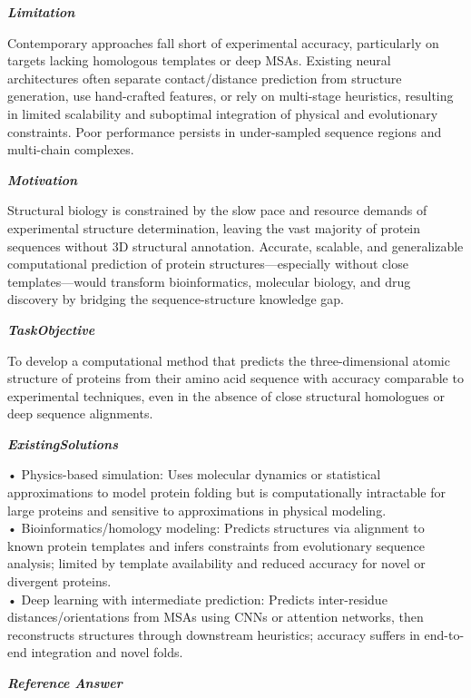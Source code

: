 \begin{tcolorbox}[
    breakable,
    title={Example of Idea Generation in Life},
    colback=LighterGray,
    colframe=DeepPurple,
    colbacktitle=DeepPurple,
    coltitle=White,
]
\textbf{\emph{\textcolor{CaseOrange}{Limitation}}}

Contemporary approaches fall short of experimental accuracy, particularly on targets lacking
homologous templates or deep MSAs. Existing neural architectures often separate contact/distance
prediction from structure generation, use hand-crafted features, or rely on multi-stage heuristics,
resulting in limited scalability and suboptimal integration of physical and evolutionary
constraints. Poor performance persists in under-sampled sequence regions and multi-chain complexes.

\textbf{\emph{\textcolor{CaseOrange}{Motivation}}}

Structural biology is constrained by the slow pace and resource demands of experimental structure
determination, leaving the vast majority of protein sequences without 3D structural annotation.
Accurate, scalable, and generalizable computational prediction of protein structures—especially
without close templates—would transform bioinformatics, molecular biology, and drug discovery by
bridging the sequence-structure knowledge gap.

\textbf{\emph{\textcolor{CaseOrange}{TaskObjective}}}

To develop a computational method that predicts the three-dimensional atomic structure of proteins
from their amino acid sequence with accuracy comparable to experimental techniques, even in the
absence of close structural homologues or deep sequence alignments.

\textbf{\emph{\textcolor{CaseOrange}{ExistingSolutions}}}

• Physics-based simulation: Uses molecular dynamics or statistical approximations to model protein folding but is computationally intractable for large proteins and sensitive to approximations in physical modeling. \\
• Bioinformatics/homology modeling: Predicts structures via alignment to known protein templates and infers constraints from evolutionary sequence analysis; limited by template availability and reduced accuracy for novel or divergent proteins. \\
• Deep learning with intermediate prediction: Predicts inter-residue distances/orientations from MSAs using CNNs or attention networks, then reconstructs structures through downstream heuristics; accuracy suffers in end-to-end integration and novel folds. 

\textbf{\emph{\textcolor{DeepPurple}{Reference Answer}}}


\end{tcolorbox}
